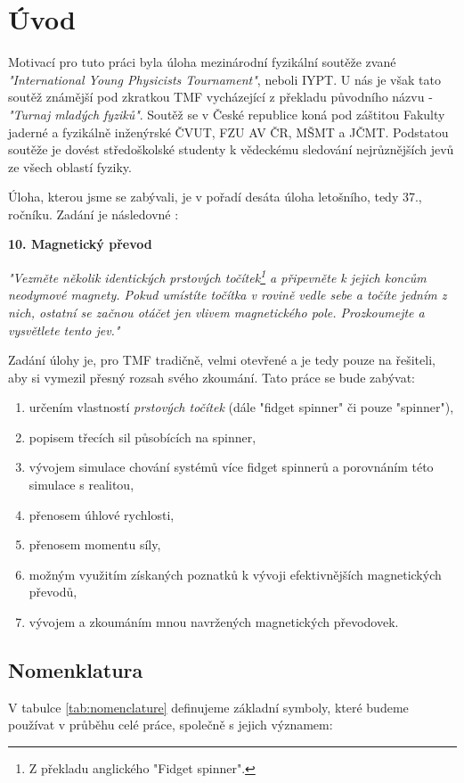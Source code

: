 
\chapter{Úvod}
\label{chap:introduction}
Motivací pro tuto práci byla úloha mezinárodní fyzikální soutěže zvané \textit{"International Young Physicists Tournament"}, neboli IYPT.
U nás je však tato soutěž známější pod zkratkou TMF vycházející z překladu původního názvu - \textit{"Turnaj mladých fyziků"}.
Soutěž se v České republice koná pod záštitou Fakulty jaderné a fyzikálně inženýrské ČVUT, FZU AV ČR, MŠMT a JČMT. Podstatou soutěže je dovést středoškolské studenty k vědeckému sledování nejrůznějších jevů ze všech oblastí fyziky.

Úloha, kterou jsme se zabývali, je v pořadí desáta úloha letošního, tedy 37., ročníku. Zadání je následovné \cite{tmf_tasks}:

\textbf{10. Magnetický převod}

\textit{"Vezměte několik identických prstových točítek\footnote{Z překladu anglického "Fidget spinner".} a připevněte k jejich koncům neodymové magnety. Pokud umístíte točítka v rovině vedle sebe a točíte jedním z nich, ostatní se začnou otáčet jen vlivem magnetického pole. Prozkoumejte a vysvětlete tento jev."}

Zadání úlohy je, pro TMF tradičně, velmi otevřené a je tedy pouze na řešiteli, aby si vymezil přesný rozsah svého zkoumání.
Tato práce se bude zabývat:

\begin{enumerate}[topsep=0pt, partopsep=0pt]
    \setlength{\itemsep}{0pt}%
    \setlength{\parskip}{0pt}%
    \item určením vlastností \textit{prstových točítek} (dále "fidget spinner" či pouze "spinner"),
    \item popisem třecích sil působících na spinner,
    \item vývojem simulace chování systémů více fidget spinnerů a porovnáním této simulace s realitou,
    \item přenosem úhlové rychlosti,
    \item přenosem momentu síly,
    \item možným využitím získaných poznatků k vývoji efektivnějších magnetických převodů,
    \item vývojem a zkoumáním mnou navržených magnetických převodovek.
\end{enumerate}

\clearpage

\section[Nomenklatura]{Nomenklatura}
\label{sec:nomenclature}
V tabulce \ref{tab:nomenclature} definujeme základní symboly, které budeme používat v průběhu celé práce, společně s jejich významem:

